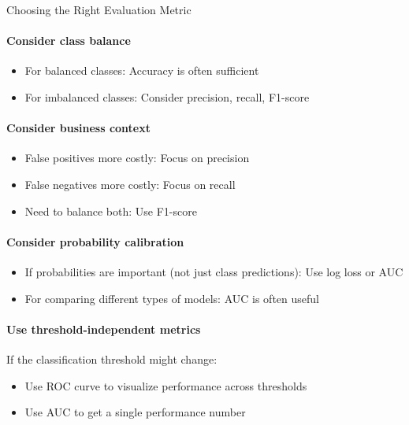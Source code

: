 \begin{KR}{Choosing the Right Evaluation Metric}\\
\paragraph{Consider class balance}
\begin{itemize}
    \item For balanced classes: Accuracy is often sufficient
    \item For imbalanced classes: Consider precision, recall, F1-score
\end{itemize}

\paragraph{Consider business context}
\begin{itemize}
    \item False positives more costly: Focus on precision
    \item False negatives more costly: Focus on recall
    \item Need to balance both: Use F1-score
\end{itemize}

\paragraph{Consider probability calibration}
\begin{itemize}
    \item If probabilities are important (not just class predictions): Use log loss or AUC
    \item For comparing different types of models: AUC is often useful
\end{itemize}

\paragraph{Use threshold-independent metrics}
If the classification threshold might change:
\begin{itemize}
    \item Use ROC curve to visualize performance across thresholds
    \item Use AUC to get a single performance number
\end{itemize}
\end{KR}

